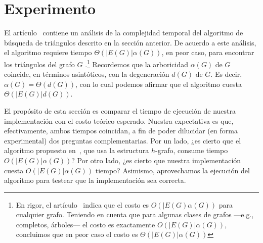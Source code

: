 \documentclass[%
    a4paper,%
    fontsize=12pt,%
    DIV=12,
    twoside,%
    openright,%
    titlepage=true,%
    headsepline,%
    toc=bibliography,%
    parskip=half,%
    cleardoublepage=empty,%
    headings=big,%
]{scrbook}
\begin{document}
\section{Experimento}

El artículo~\cite{LinSoulignacSzwarcfiterTCS2012} contiene un análisis de la complejidad temporal del algoritmo de búsqueda de triángulos descrito en la sección anterior.  De acuerdo a este análisis, el algoritmo requiere tiempo $\Theta(|E(G)|\alpha(G))$, en peor caso, para encontrar los triángulos del grafo $G$ .\footnote{En rigor, el artículo~\cite{LinSoulignacSzwarcfiterTCS2012} indica que el costo es $O(|E(G)\alpha(G))$ para cualquier grafo.  Teniendo en cuenta que para algunas clases de grafos ---e.g., completos, árboles--- el costo es exactamente $O(|E(G)|\alpha(G))$, concluimos que en peor caso el costo es $\Theta(|E(G)|\alpha(G))$}  Recordemos que la arboricidad $\alpha(G)$ de $G$ coincide, en términos asintóticos, con la degeneración $d(G)$ de $G$.  Es decir, $\alpha(G) = \Theta(d(G))$, con lo cual podemos afirmar que el algoritmo cuesta $\Theta(|E(G)|d(G))$.  

El propósito de esta sección es comparar el tiempo de ejecución de nuestra implementación con el costo teórico esperado.  Nuestra expectativa es que, efectivamente, ambos tiempos coincidan, a fin de poder dilucidar (en forma experimental) dos preguntas complementarias.  Por un lado, ¿es cierto que el algoritmo propuesto en~\cite{LinSoulignacSzwarcfiterTCS2012}, que usa la estructura $h$-grafo, consume tiempo $O(|E(G)|\alpha(G))$?  Por otro lado, ¿es cierto que nuestra implementación cuesta $O(|E(G)|\alpha(G))$ tiempo?  Asimismo, aprovechamos la ejecución del algoritmo para testear que la implementación sea correcta.
\end{document}

